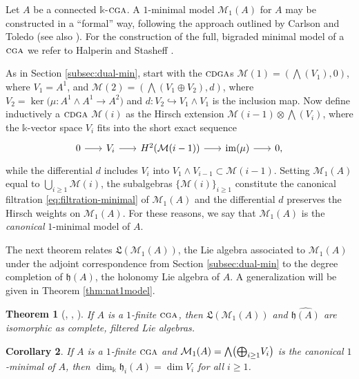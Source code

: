\documentclass{article}
\numberwithin{equation}{section}
\newtheorem{theorem}{Theorem}[section]
\newtheorem{corollary}[theorem]{Corollary}
\theoremstyle{definition}
\renewcommand{\k}{\mathbb{k}}
\newcommand{\M}{\mathcal{M}}
\newcommand{\h}{{\mathfrak{h}}}
\newcommand{\fL}{\mathfrak{L}}
\newcommand{\cga}{\ensuremath{\textsc{cga}}}
\newcommand{\cdga}{\ensuremath{\textsc{cdga}}}
\DeclareMathOperator{\im}{im}
\newcommand{\inj}{\hookrightarrow}
\newcommand{\bwedge}{\mbox{\normalsize $\bigwedge$}}
\newcommand{\boplus}{\mbox{\normalsize $\bigoplus$}}
\begin{document}
Let $A$ be a connected $\k$-$\cga$. A $1$-minimal model $\M_1(A)$ for $A$ may 
be constructed in a ``formal'' way, following the approach outlined by Carlson 
and Toledo \cite{CT} (see also \cite{SW-forum}).  For the construction of the 
full, bigraded minimal model of a $\cga$ we refer to Halperin and Stasheff \cite{HS79}.
 
As in Section \ref{subsec:dual-min}, start with the $\cdga$s 
$\M(1)=(\bigwedge(V_1),0)$, 
where $V_1=A^1$, and $\M(2)=(\bigwedge(V_1\oplus V_2),d)$,
where $V_2=\ker \big(\mu\colon A^1\wedge A^1\to A^2\big)$ and 
$d\colon V_2\inj V_1\wedge V_1$ is the inclusion map.  Now 
define inductively a $\cdga$ $\M(i)$ as the Hirsch extension 
$\M(i-1)\otimes \bigwedge (V_{i})$, where 
the $\k$-vector space $V_{i}$ fits into the short exact sequence 
\begin{equation}
\label{eq:ses}
\begin{tikzcd}[column sep=18pt]
0 \ar[r]& V_{i} \ar[r]&  H^2(\M(i-1)) \ar[r]& \im(\mu) \ar[r]& 0,
\end{tikzcd}
\end{equation}
while the differential $d$ includes $V_{i}$ into $V_1\wedge V_{i-1}\subset \M(i-1)$. 
Setting $\M_1(A)$ equal to $\bigcup_{i\ge 1} \M(i)$, 
the subalgebras $\{\M(i)\}_{i\ge 1}$ constitute the canonical filtration 
\eqref{eq:filtration-minimal} of $\M_1(A)$ and the differential 
$d$ preserves the Hirsch weights on $\M_1(A)$.  For these reasons, 
we say that $\M_1(A)$ is the {\em canonical}\/ $1$-minimal model of $A$. 

The next theorem relates $\fL(\M_1(A))$, the Lie algebra associated 
to $\M_1(A)$ under the adjoint correspondence from Section \ref{subsec:dual-min}
to the degree completion of $\h(A)$, the holonomy Lie 
algebra of $A$.  A generalization will be given in Theorem 
\ref{thm:nat1model}.

\begin{theorem}[\cite{Mo}, \cite{MP}, \cite{SW-forum}]
\label{thm:model-holonomy}
If $A$ is a $1$-finite $\cga$, then $\fL(\M_1(A))$ and $\widehat{\h(A)}$ 
are isomorphic as complete, filtered Lie algebras. 
\end{theorem}

\begin{corollary}
\label{cor:holomin}
If $A$ is a $1$-finite $\cga$ and $\M_1(A)=\bwedge \big(\boplus _{i\ge 1} V_i \big)$ 
is the canonical $1$-minimal of $A$, then  $\dim_{\k} \h_i(A) = \dim V_i$ for all 
$i\ge 1$. 
\end{corollary}
\end{document}

